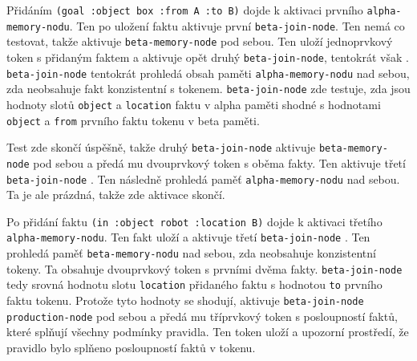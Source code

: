 Přidáním \verb|(goal :object box :from A :to B)| dojde k aktivaci prvního
\verb|alpha-memory-nodu|. Ten po uložení faktu aktivuje první
\verb|beta-join-node|. Ten nemá co testovat, takže aktivuje
\verb|beta-memory-node| pod sebou. Ten uloží jednoprvkový token s přidaným
faktem a aktivuje opět druhý \verb|beta-join-node|, tentokrát však .
\verb|beta-join-node| tentokrát prohledá obsah paměti \verb|alpha-memory-nodu|
nad sebou, zda neobsahuje fakt konzistentní s tokenem. \verb|beta-join-node| zde
testuje, zda jsou hodnoty slotů \verb|object| a \verb|location| faktu v alpha
paměti shodné s hodnotami \verb|object| a \verb|from| prvního faktu tokenu v
beta paměti.

Test zde skončí úspěšně, takže druhý \verb|beta-join-node| aktivuje
\verb|beta-memory-node| pod sebou a předá mu dvouprvkový token s oběma fakty.
Ten aktivuje třetí \verb|beta-join-node| . Ten následně prohledá paměť
\verb|alpha-memory-nodu| nad sebou. Ta je ale prázdná, takže zde aktivace skončí.

Po přidání faktu \verb|(in :object robot :location B)| dojde k aktivaci třetího
\verb|alpha-memory-nodu|. Ten fakt uloží a aktivuje třetí \verb|beta-join-node|
. Ten prohledá paměť \verb|beta-memory-nodu| nad sebou, zda
neobsahuje konzistentní tokeny. Ta obsahuje dvouprvkový token s prvními dvěma
fakty. \verb|beta-join-node| tedy srovná hodnotu slotu \verb|location| přidaného
faktu s hodnotou \verb|to| prvního faktu tokenu. Protože tyto hodnoty se
shodují, aktivuje \verb|beta-join-node| \verb|production-node| pod sebou a předá
mu tříprvkový token s posloupností faktů, které splňují všechny podmínky
pravidla. Ten token uloží a upozorní prostředí, že pravidlo bylo splňeno
posloupností faktů v tokenu.
